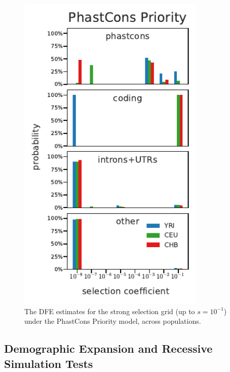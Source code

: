 \documentclass[11pt]{article}
\begin{document}
\begin{figure}[htbp]
    \label{suppfig:strong-sel-dfe-pop-feature}
  \centering
  \includegraphics[width=0.8\textwidth]{figures/supplementary/phastcons_priority_pop_dfe_strongselgrid.pdf}

  \caption{The DFE estimates for the strong selection grid (up to $s=10^{-1}$)
  under the PhastCons Priority model, across populations.}
\end{figure}

\subsection{Demographic Expansion and Recessive Simulation Tests}
\label{supp:sim-assum}
\end{document}
